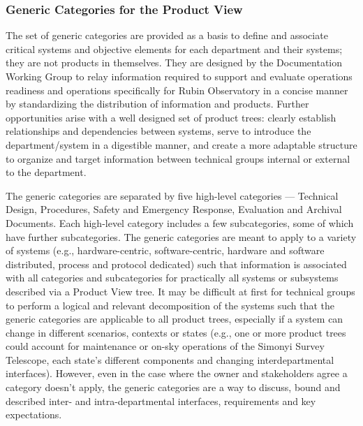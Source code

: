 \subsubsection{Generic Categories for the Product View}

The set of generic categories are provided as a basis to define and associate critical systems and objective elements for each department and their systems; they are not products in themselves.
They are designed by the Documentation Working Group to relay information required to support and evaluate operations readiness and operations specifically for Rubin Observatory in a concise manner by standardizing the distribution of information and products.
Further opportunities arise with a well designed set of product trees: clearly establish relationships and dependencies between systems, serve to introduce the department/system in a digestible manner, and create a more adaptable structure to organize and target information between technical groups internal or external to the department.

The generic categories are separated by five high-level categories --- Technical Design, Procedures, Safety and Emergency Response, Evaluation and Archival Documents.
Each high-level category includes a few subcategories, some of which have further subcategories.
The generic categories are meant to apply to a variety of systems (e.g., hardware-centric, software-centric, hardware and software distributed, process and protocol dedicated) such that information is associated with all categories and subcategories for practically all systems or subsystems described via a Product View tree.
It may be difficult at first for technical groups to perform a logical and relevant decomposition of the systems such that the generic categories are applicable to all product trees, especially if a system can change in different scenarios, contexts or states (e.g., one or more product trees could account for maintenance or on-sky operations of the Simonyi Survey Telescope, each state's different components and changing interdepartmental interfaces).
However, even in the case where the owner and stakeholders agree a category doesn't apply, the generic categories are a way to discuss, bound and described inter- and intra-departmental interfaces, requirements and key expectations.

